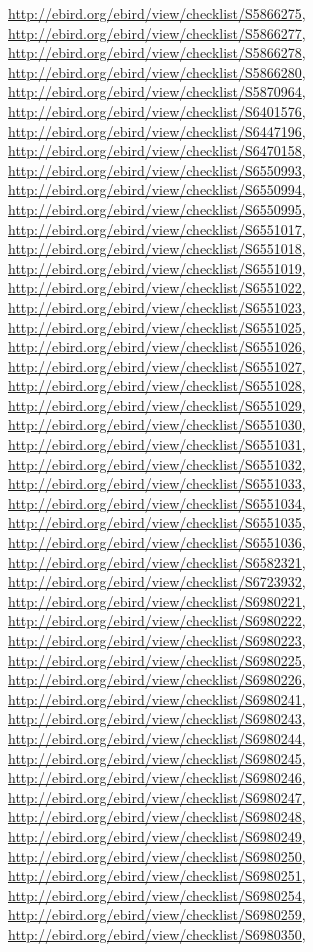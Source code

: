 \documentclass[9pt, article]{memoir}
\begin{document}
\begin{multicols}{2}
\url{http://ebird.org/ebird/view/checklist/S5866275}, 
\url{http://ebird.org/ebird/view/checklist/S5866277}, 
\url{http://ebird.org/ebird/view/checklist/S5866278}, 
\url{http://ebird.org/ebird/view/checklist/S5866280}, 
\url{http://ebird.org/ebird/view/checklist/S5870964}, 
\url{http://ebird.org/ebird/view/checklist/S6401576}, 
\url{http://ebird.org/ebird/view/checklist/S6447196}, 
\url{http://ebird.org/ebird/view/checklist/S6470158}, 
\url{http://ebird.org/ebird/view/checklist/S6550993}, 
\url{http://ebird.org/ebird/view/checklist/S6550994}, 
\url{http://ebird.org/ebird/view/checklist/S6550995}, 
\url{http://ebird.org/ebird/view/checklist/S6551017}, 
\url{http://ebird.org/ebird/view/checklist/S6551018}, 
\url{http://ebird.org/ebird/view/checklist/S6551019}, 
\url{http://ebird.org/ebird/view/checklist/S6551022}, 
\url{http://ebird.org/ebird/view/checklist/S6551023}, 
\url{http://ebird.org/ebird/view/checklist/S6551025}, 
\url{http://ebird.org/ebird/view/checklist/S6551026}, 
\url{http://ebird.org/ebird/view/checklist/S6551027}, 
\url{http://ebird.org/ebird/view/checklist/S6551028}, 
\url{http://ebird.org/ebird/view/checklist/S6551029}, 
\url{http://ebird.org/ebird/view/checklist/S6551030}, 
\url{http://ebird.org/ebird/view/checklist/S6551031}, 
\url{http://ebird.org/ebird/view/checklist/S6551032}, 
\url{http://ebird.org/ebird/view/checklist/S6551033}, 
\url{http://ebird.org/ebird/view/checklist/S6551034}, 
\url{http://ebird.org/ebird/view/checklist/S6551035}, 
\url{http://ebird.org/ebird/view/checklist/S6551036}, 
\url{http://ebird.org/ebird/view/checklist/S6582321}, 
\url{http://ebird.org/ebird/view/checklist/S6723932}, 
\url{http://ebird.org/ebird/view/checklist/S6980221}, 
\url{http://ebird.org/ebird/view/checklist/S6980222}, 
\url{http://ebird.org/ebird/view/checklist/S6980223}, 
\url{http://ebird.org/ebird/view/checklist/S6980225}, 
\url{http://ebird.org/ebird/view/checklist/S6980226}, 
\url{http://ebird.org/ebird/view/checklist/S6980241}, 
\url{http://ebird.org/ebird/view/checklist/S6980243}, 
\url{http://ebird.org/ebird/view/checklist/S6980244}, 
\url{http://ebird.org/ebird/view/checklist/S6980245}, 
\url{http://ebird.org/ebird/view/checklist/S6980246}, 
\url{http://ebird.org/ebird/view/checklist/S6980247}, 
\url{http://ebird.org/ebird/view/checklist/S6980248}, 
\url{http://ebird.org/ebird/view/checklist/S6980249}, 
\url{http://ebird.org/ebird/view/checklist/S6980250}, 
\url{http://ebird.org/ebird/view/checklist/S6980251}, 
\url{http://ebird.org/ebird/view/checklist/S6980254}, 
\url{http://ebird.org/ebird/view/checklist/S6980259}, 
\url{http://ebird.org/ebird/view/checklist/S6980350}, 

\end{multicols}
\end{document}
